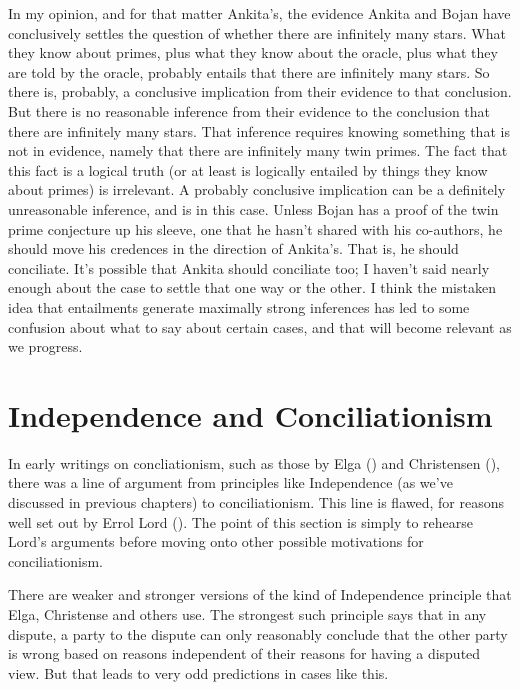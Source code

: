 \documentclass[
  10pt,
  letterpaper,
  twoside]{scrbook}
\begin{document}
In my opinion, and for that matter {Ankita}'s, the evidence {Ankita} and
{Bojan} have conclusively settles the question of whether there are
infinitely many stars. What they know about primes, plus what they know
about the oracle, plus what they are told by the oracle, probably
entails that there are infinitely many stars. So there is, probably, a
conclusive implication from their evidence to that conclusion. But there
is no reasonable inference from their evidence to the conclusion that
there are infinitely many stars. That inference requires knowing
something that is not in evidence, namely that there are infinitely many
twin primes. The fact that this fact is a logical truth (or at least is
logically entailed by things they know about primes) is irrelevant. A
probably conclusive implication can be a definitely unreasonable
inference, and is in this case. Unless {Bojan} has a proof of the twin
prime conjecture up his sleeve, one that he hasn't shared with his
co-authors, he should move his credences in the direction of {Ankita}'s.
That is, he should conciliate. It's possible that {Ankita} should
conciliate too; I haven't said nearly enough about the case to settle
that one way or the other. I think the mistaken idea that entailments
generate maximally strong inferences has led to some confusion about
what to say about certain cases, and that will become relevant as we
progress.

\section{Independence and
Conciliationism}\label{independenceandconciliationism}

In early writings on concliationism, such as those by Elga
() and Christensen
(), there was a line of argument
from principles like Independence (as we've discussed in previous
chapters) to conciliationism. This line is flawed, for reasons well set
out by Errol Lord (). The point of this
section is simply to rehearse Lord's arguments before moving onto other
possible motivations for conciliationism.

There are weaker and stronger versions of the kind of Independence
principle that Elga, Christense and others use. The strongest such
principle says that in any dispute, a party to the dispute can only
reasonably conclude that the other party is wrong based on reasons
independent of their reasons for having a disputed view. But that leads
to very odd predictions in cases like this.
\end{document}
